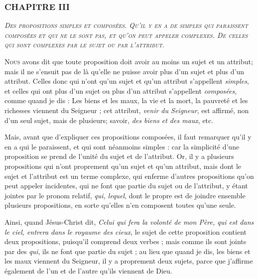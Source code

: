 \subsubsection{\centering \Large CHAPITRE III}
\begin{center}\emph{\large\scshape Des propositions simples et composées. Qu'il y en a de simples qui paraissent composées et qui ne le sont pas, et qu'on peut appeler complexes. De celles qui sont complexes par le sujet ou par l'attribut.}\end{center}


	\lettrine{N}{ous} avons dit que toute proposition doit avoir au moins un sujet et un attribut; mais il ne s'ensuit pas de là qu'elle ne puisse avoir plus d'un sujet et plus d'un attribut. Celles donc qui n'ont qu'un sujet et qu'un attribut s'appellent \emph{simples}, et celles qui ont plus d'un sujet ou plus d'un attribut s'appellent \emph{composées}, comme quand je dis : Les biens et les maux, la vie et la mort, la pauvreté et les richesses viennent du Seigneur ; cet attribut, \emph{venir du Seigneur}, est affirmé, non d'un seul sujet, mais de plusieurs; savoir, \emph{des biens et des maux}, etc.

Mais, avant que d'expliquer ces propositions composées, il faut remarquer qu'il y en a qui le paraissent, et qui sont néanmoins simples : car la simplicité d'une proposition se prend de l'unité du sujet et de l'attribut. Or, il y a plusieurs propositions qui n'ont proprement qu'un sujet et qu'un attribut, mais dont le sujet et l'attribut est un terme complexe, qui enferme d'autres propositions qu'on peut appeler incidentes, qui ne font que partie du sujet ou de l'attribut, y étant jointes par le pronom relatif, \emph{qui, lequel}, dont le propre est de joindre ensemble plusieurs propositions, en sorte qu'elles n'en composent toutes qu'une seule.

Ainsi, quand Jésus-Christ dit, \emph{Celui qui fera la volonté de mon Père, qui est dans le ciel, entrera dans le royaume des cieux}, le sujet de cette proposition contient deux propositions, puisqu'il comprend deux verbes ; mais comme ils sont joints par des \emph{qui}, ils ne font que partie du sujet ; au lieu que quand je dis, les biens et les maux viennent du Seigneur, il y a proprement deux sujets, parce que j'affirme également de l'un et de l'autre qu'ils viennent de Dieu.

